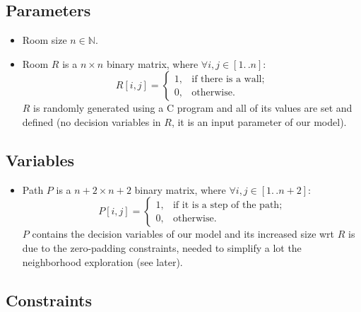 \documentclass[12pt]{article}
\newcommand*{\Nset}{\mathbb{N}}
\newcommand*{\itc}{\mathrel{:}} %
\newcommand*{\twodots}{\mathrel{. \, .}}
\begin{document}
\subsection{Parameters}
\begin{itemize}
  \item
  Room size $n \in \Nset$.
  \item
  Room $R$ is a $n \times n$ binary matrix,
  where $\forall i, j \in [1 \twodots n] \itc$
    \[
    R[i, j] =
    \begin{cases}
      1,
        &\text{if there is a wall};\\
      0,
        &\text{otherwise.}
    \end{cases}
    \]
  $R$ is randomly generated  using a C program and all of its values
  are set and defined (no decision variables in $R$, it is an input parameter
  of our model).
\end{itemize}

\subsection{Variables}
\begin{itemize}
  \item
  Path $P$ is a $n+2 \times n+2$ binary matrix,
  where $\forall i, j \in [1 \twodots n+2] \itc$
    \[
    P[i, j] =
    \begin{cases}
      1,
        &\text{if it is a step of the path};\\
      0,
        &\text{otherwise.}
    \end{cases}
    \]
    $P$ contains the decision variables of our model and its
    increased size wrt $R$ is due to the zero-padding constraints,
    needed to simplify a lot the neighborhood exploration (see later).
\end{itemize}

\subsection{Constraints}
\end{document}
